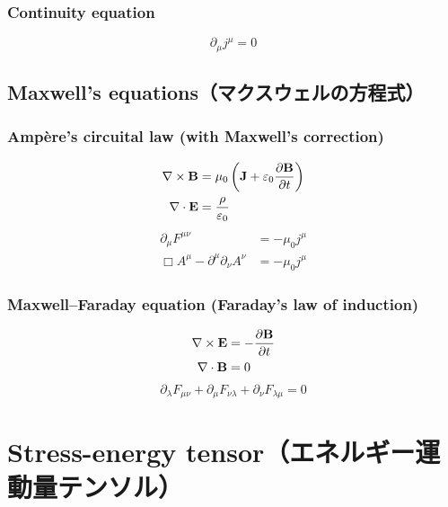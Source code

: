 \subsubsection{Continuity equation}
\begin{equation}
  \partial_\mu j^\mu = 0
\end{equation}

\subsection{Maxwell's equations（マクスウェルの方程式）}
\subsubsection{Ampère's circuital law (with Maxwell's correction)}
\begin{align}
  {\bf \nabla} \times {\bf B}
    & = \mu_0 \left( {\bf J} + \varepsilon_0 \frac{\partial {\bf B}}{\partial t} \right) \\
  {\bf \nabla} \cdot {\bf E}
    & = \frac{\rho}{\varepsilon_0}
\end{align}
\begin{align}
  \partial_\mu F^{\mu \nu}
    & = -\mu_0 j^\mu \\
  \Box A^\mu - \partial^\mu \partial_\nu A^\nu
    & = -\mu_0 j^\mu
\end{align}

\subsubsection{Maxwell–Faraday equation (Faraday's law of induction)}
\begin{align}
  {\bf \nabla} \times {\bf E}
    & = - \frac{\partial {\bf B}}{\partial t} \\
  {\bf \nabla} \cdot {\bf B}
    & = 0
\end{align}
\begin{equation}
  \partial_\lambda F_{\mu \nu}
    + \partial_\mu F_{\nu \lambda}
    + \partial_\nu F_{\lambda \mu}
    = 0
\end{equation}



%
%
%
%
\section{Stress-energy tensor（エネルギー運動量テンソル）}


